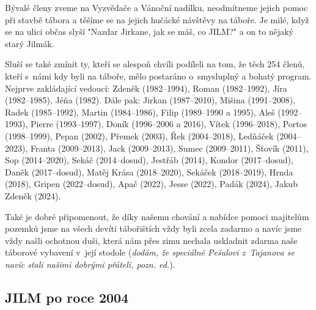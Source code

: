 \documentclass[a5paper, 11pt, twoside]{article}
\begin{document}
Bývalé členy zveme na Vyzvědače a Vánoční nadílku, neodmítneme jejich
pomoc při stavbě tábora a těšíme se na jejich hučácké návštěvy na
táboře. Je milé, když se na ulici občas slyší "Nazdar Jirkane, jak se
máš, co JILM?{}" a on to nějaký starý Jilmák.

Sluší se také zmínit ty, kteří se alespoň chvíli podíleli na tom, že
těch 254 členů, kteří s~námi kdy byli na táboře, mělo postaráno
o~smysluplný a bohatý program. Nejprve zakládající vedoucí: Zdeněk
(1982--1994), Roman (1982--1992), Jíra (1982--1985), Jéňa (1982). Dále
pak: Jirkan (1987--2010), Mišina (1991--2008), Radek (1985--1992),
Martin (1984--1986), Filip (1989--1990 a 1995), Aleš (1992--1993),
Pierre (1993--1997), Doník (1996--2006 a 2016), Vítek (1996--2018),
Portos (1998--1999), Pepan (2002), Přemek (2003), Řek (2004--2018),
Ledňáček (2004--2023), Franta (2009--2013), Jack (2009--2013), Sumec
(2009--2011), Šťovík (2011), Sop (2014--2020), Sekáč (2014--dosud),
Jestřáb (2014), Kondor (2017--dosud), Daněk (2017--dosud), Matěj Krása
(2018--2020), Sekáček (2018--2019), Hrnda (2018), Gripen (2022--dosud),
Apač (2022), Jesse (2022), Padák (2024), Jakub Zdeněk (2024).

Také je dobré připomenout, že díky našemu chování a nabídce pomoci
majitelům pozemků jsme na všech devíti tábořištích vždy byli zcela
zadarmo a navíc jsme vždy našli ochotnou duši, která nám přes zimu
nechala uskladnit zdarma naše táborové vybavení v~její stodole
(\textit{dodám, že speciálně Pešulovi z~Tajanova se navíc stali našimi
dobrými přáteli, pozn. ed.}).

\subsection{JILM po roce 2004}
\end{document}
